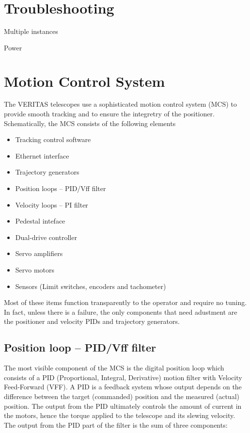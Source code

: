 \documentclass[letterpaper,12pt]{report}
\begin{document}
\chapter{Troubleshooting}
\label{CHAP::TROUBLESHOOTING}
\thispagestyle{fancy}

Multiple instances

Power

\chapter{Motion Control System}
\label{CHAP::MCS}
\thispagestyle{fancy}

The VERITAS telescopes use a sophisticated motion control system (MCS)
to provide smooth tracking and to ensure the integretry of the
positioner. Schematically, the MCS consists of the following elements

\begin{itemize}
\item Tracking control software
\item Ethernet interface
\item Trajectory generators
\item Position loops -- PID/Vff filter
\item Velocity loops -- PI filter
\item Pedestal inteface
\item Dual-drive controller
\item Servo amplifiers
\item Servo motors
\item Sensors (Limit switches, encoders and tachometer)
\end{itemize}

Most of these items function transparently to the operator and require
no tuning. In fact, unless there is a failure, the only components
that need adustment are the positioner and velocity PIDs and
trajectory generators.

\section{Position loop -- PID/Vff filter}

The most visible component of the MCS is the digital position loop
which consists of a PID (Proportional, Integral, Derivative) motion
filter with Velocity Feed-Forward (VFF). A PID is a feedback system
whose output depends on the difference between the target (commanded)
position and the measured (actual) position. The output from the PID
ultimately controls the amount of current in the motors, hence the
torque applied to the telescope and its slewing velocity. The output
from the PID part of the filter is the sum of three components:
\end{document}
